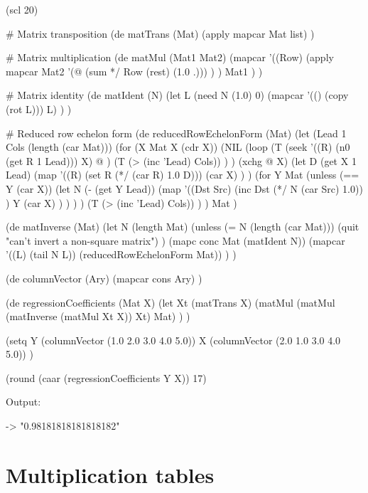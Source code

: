 \begin{wideverbatim}

(scl 20)

# Matrix transposition
(de matTrans (Mat)
   (apply mapcar Mat list) )

# Matrix multiplication
(de matMul (Mat1 Mat2)
   (mapcar
      '((Row)
         (apply mapcar Mat2
            '(@ (sum */ Row (rest) (1.0 .))) ) )
      Mat1 ) )

# Matrix identity
(de matIdent (N)
   (let L (need N (1.0) 0)
      (mapcar '(() (copy (rot L))) L) ) )

# Reduced row echelon form
(de reducedRowEchelonForm (Mat)
   (let (Lead 1  Cols (length (car Mat)))
      (for (X Mat X (cdr X))
         (NIL
            (loop
               (T (seek '((R) (n0 (get R 1 Lead))) X)
                  @ )
               (T (> (inc 'Lead) Cols)) ) )
         (xchg @ X)
         (let D (get X 1 Lead)
            (map
               '((R) (set R (*/ (car R) 1.0 D)))
               (car X) ) )
         (for Y Mat
            (unless (== Y (car X))
               (let N (- (get Y Lead))
                  (map
                     '((Dst Src)
                        (inc Dst (*/ N (car Src) 1.0)) )
                     Y
                     (car X) ) ) ) )
         (T (> (inc 'Lead) Cols)) ) )
   Mat )

\end{wideverbatim}

\begin{wideverbatim}


(de matInverse (Mat)
   (let N (length Mat)
      (unless (= N (length (car Mat)))
         (quit "can't invert a non-square matrix") )
      (mapc conc Mat (matIdent N))
      (mapcar '((L) (tail N L)) (reducedRowEchelonForm Mat)) ) )

(de columnVector (Ary)
   (mapcar cons Ary) )

(de regressionCoefficients (Mat X)
   (let Xt (matTrans X)
      (matMul (matMul (matInverse (matMul Xt X)) Xt) Mat) ) )

(setq
   Y (columnVector (1.0 2.0 3.0 4.0 5.0))
   X (columnVector (2.0 1.0 3.0 4.0 5.0)) )

(round (caar (regressionCoefficients Y X)) 17)

Output:

-> "0.98181818181818182"

\end{wideverbatim}

\pagebreak{}
\section*{Multiplication tables}

